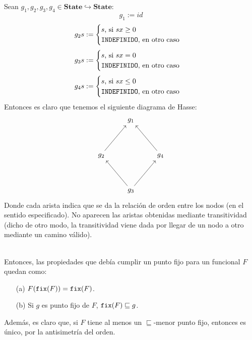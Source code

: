 \begin{example}
Sean $g_1, g_2, g_3, g_4 \in \mathbf{State}\hookrightarrow \mathbf{State}$:
$$g_1 := id$$
$$g_2 s := \begin{cases}
    s \text{, si } sx \geq 0 \\
    \texttt{INDEFINIDO} \text{, en otro caso}
\end{cases}$$
$$g_3 s := \begin{cases}
    s \text{, si } sx = 0 \\
    \texttt{INDEFINIDO} \text{, en otro caso}
\end{cases}$$
$$g_4 s := \begin{cases}
    s \text{, si } sx \leq 0 \\
    \texttt{INDEFINIDO} \text{, en otro caso}
\end{cases}$$
Entonces es claro que tenemos el siguiente diagrama de Hasse: 
$$
\begin{tikzcd}
&g_1& \\
&& \\
g_2\arrow[uur]{} && g_4\arrow[uul]{} \\
&& \\
&g_3\arrow[uul]{} \arrow[uur]{}&
\end{tikzcd}
$$
Donde cada arista indica que se da la relación de orden entre los nodos (en el sentido especificado). No aparecen las aristas obtenidas mediante transitividad (dicho de otro modo, la transitividad viene dada por llegar de un nodo a otro mediante un camino válido).
\end{example}
\\

Entonces, las propiedades que debía cumplir un punto fijo para un funcional $F$ quedan como: 
\begin{itemize}
    \item[(a)] $F(\texttt{fix}(F)) =  \texttt{fix}(F)$.
    \item[(b)] Si $g$ es punto fijo de $F$, $\texttt{fix}(F) \sqsubseteq g$.
\end{itemize}
Además, es claro que, si $F$ tiene al menos un $\sqsubseteq$-menor punto fijo, entonces es único, por la antisimetría del orden.
\\

